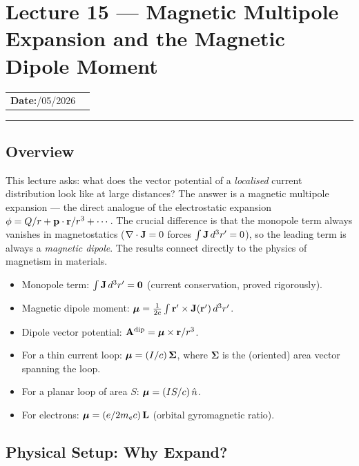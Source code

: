 \section{Lecture 15 — Magnetic Multipole Expansion and the Magnetic Dipole Moment}\label{sec:lec15}

\begin{center}
\begin{tabular}{ll}
  \textbf{Date:}\quad 26/05/2026 & \\
\end{tabular}
\end{center}
\hrule\vspace{1.5em}

\subsection*{Overview}

This lecture asks: what does the vector potential of a \emph{localised} current
distribution look like at large distances?  The answer is a magnetic multipole
expansion — the direct analogue of the electrostatic expansion $\phi = Q/r +
\mathbf{p}\cdot\mathbf{r}/r^3 + \cdots$.  The crucial difference is that the monopole term
always vanishes in magnetostatics ($\nabla\cdot\mathbf{J} = 0$ forces $\int\mathbf{J}\,d^3r'=0$),
so the leading term is always a \emph{magnetic dipole}.  The results connect
directly to the physics of magnetism in materials.

\begin{itemize}
  \item Monopole term: $\int\mathbf{J}\,d^3r' = \mathbf{0}$ (current conservation, proved rigorously).
  \item Magnetic dipole moment: $\boldsymbol{\mu} = \frac{1}{2c}\int\mathbf{r}'\times\mathbf{J}(\mathbf{r}')\,d^3r'$.
  \item Dipole vector potential: $\mathbf{A}^{\rm dip} = \boldsymbol{\mu}\times\mathbf{r}/r^3$.
  \item For a thin current loop: $\boldsymbol{\mu} = (I/c)\,\boldsymbol{\Sigma}$, where
        $\boldsymbol{\Sigma}$ is the (oriented) area vector spanning the loop.
  \item For a planar loop of area $S$: $\boldsymbol{\mu} = (IS/c)\,\hat{n}$.
  \item For electrons: $\boldsymbol{\mu} = (e/2m_e c)\,\mathbf{L}$ (orbital gyromagnetic ratio).
\end{itemize}

\subsection{Physical Setup: Why Expand?}\label{subsec:lec15-setup}

